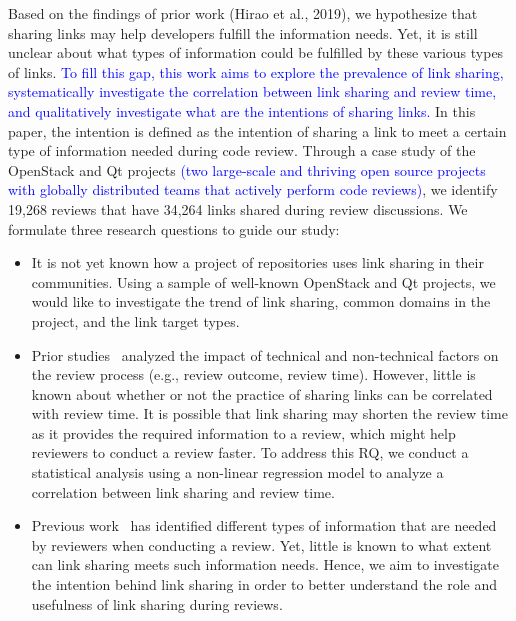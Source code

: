 Based on the findings of prior work (Hirao et al., 2019), we hypothesize that sharing links may help developers fulfill the information needs. Yet, it is still unclear about what types of information could be fulfilled by these various types of links. \textcolor{blue}{To fill this gap, this work aims to explore the prevalence of link sharing, systematically investigate the correlation between link sharing and review time, and qualitatively investigate what are the intentions of sharing links.}
In this paper, the intention is defined as the intention of sharing a link to meet a certain type of information needed during code review.
Through a case study of the OpenStack and Qt projects \textcolor{blue}{(two large-scale and thriving open source projects with globally distributed teams that actively perform code reviews)}, we identify 19,268 reviews that have 34,264 links shared during review discussions.
We formulate three research questions to guide our study: 
\begin{itemize}
    \item \textbf{\RqOne}
    It is not yet known how a project of repositories uses link sharing in their communities.
    Using a sample of well-known OpenStack and Qt projects, we would like to investigate the trend of link sharing, common domains in the project, and the link target types.
    \item \textbf{\RqTwo} Prior studies~\citep{Olga_2016, Shopify_2018} analyzed the impact of technical and non-technical factors on the review process (e.g., review outcome, review time).
    However, little is known about whether or not the practice of sharing links can be correlated with review time.
    It is possible that link sharing may shorten the review time as it provides the required information to a review, which might help reviewers to conduct a review faster.
    To address this RQ, we conduct a statistical analysis using a non-linear regression model to analyze a correlation between link sharing and review time.
    \item \textbf{\RqThree} Previous work~\citep{Information_2018} has identified different types of information that are needed by reviewers when conducting a review. 
    Yet, little is known to what extent can link sharing meets such information needs.
    Hence, we aim to investigate the intention behind link sharing in order to better understand the role and usefulness of link sharing during reviews.
\end{itemize}

